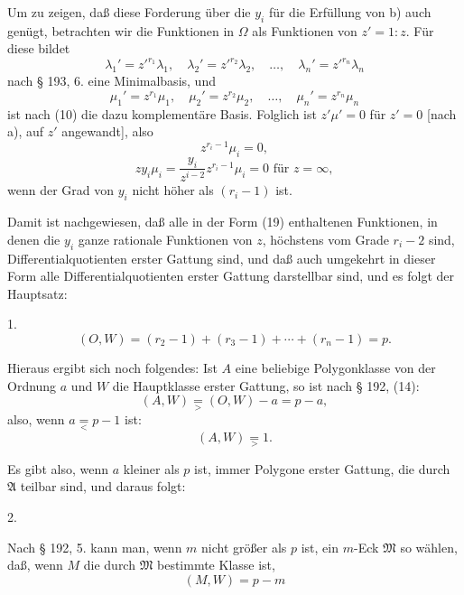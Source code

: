 
Um zu zeigen, daß diese Forderung über die $y_i$ für die Erfüllung
 von b) auch genügt, betrachten wir die Funktionen in $\Omega$
als Funktionen von $z' = 1:z$. Für diese bildet
\[
\lambda_1' = z'^{r_1}\lambda_1,\quad \lambda_2' = z'^{r_2}\lambda_2,\quad \ldots,\quad \lambda_n' = z'^{r_n}\lambda_n
\]
nach § 193, 6. eine Minimalbasis, und
\[
\mu_1' = z^{r_1}\mu_1,\quad \mu_2' = z^{r_2}\mu_2,\quad \ldots,\quad \mu_n' = z^{r_n}\mu_n
\]
ist nach (10) die dazu komplementäre Basis. Folglich ist $z'\mu' = 0$
für $z' = 0$ [nach a), auf $z'$ angewandt], also
\[
z^{r_i-1}\mu_i = 0,
\]
\[
zy_i\mu_i = \frac{y_i}{z^{i-2}}z^{r_i-1}\mu_i = 0 \text{ für } z = \infty, %
\]
wenn der Grad von $y_i$ nicht höher als $(r_i-1)$ ist. %

Damit ist nachgewiesen, daß alle in der Form (19) enthaltenen
 Funktionen, in denen die $y_i$ ganze rationale Funktionen
von $z$, höchstens vom Grade $r_i-2$ sind, Differentialquotienten
erster Gattung sind, und daß auch umgekehrt in dieser Form
alle Differentialquotienten erster Gattung darstellbar sind, und
es folgt der Hauptsatz:

1. 
\[
(O,W) = (r_2-1)+(r_3-1)+\cdots+(r_n-1) = p.
\]

Hieraus ergibt sich noch folgendes: Ist $A$ eine beliebige
Polygonklasse von der Ordnung $a$ und $W$ die Hauptklasse erster
Gattung, so ist nach § 192, (14):
\[
(A, W) \mathrel{\underset{>}{=}} (O, W) - a = p - a, %
\]
also, wenn $a \mathrel{\underset{<}{=}} p - 1$ ist: %
\[
(A, W) \mathrel{\underset{>}{=}} 1. %
\]

Es gibt also, wenn $a$ kleiner als $p$ ist, immer Polygone erster
Gattung, die durch $\mathfrak{A}$ teilbar sind, und daraus folgt:

2. 

Nach § 192, 5. kann man, wenn $m$ nicht größer als $p$ ist,
ein $m$-Eck $\mathfrak{M}$ so wählen, daß, wenn $M$ die durch $\mathfrak{M}$ bestimmte
Klasse ist,
\[
(M, W) = p - m
\]
